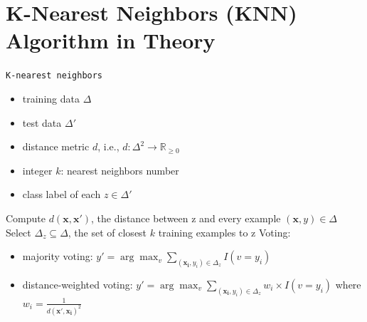 \documentclass{article}
\newcommand{\argmax}{\arg\!\max}
\begin{document}
\section*{K-Nearest Neighbors (KNN) Algorithm in Theory}
{\small
\begin{center}
\begin{algorithmic}[1]\label{alg:knn}
 \texttt{K-nearest neighbors}
\begin{itemize}
\item \textsf{training data} $\Delta$
\item \textsf{test data} $\Delta'$  
\item \textsf{distance metric} $d$, i.e., $d:\Delta^2\rightarrow \mathbb{R}_{\geq 0}$ 
\item \textsf{integer} $k$: \textsf{nearest neighbors number}
\end{itemize}
\begin{itemize}
\item \textsf{class label of each} $z \in \Delta' $
\end{itemize}
\State  \textsf{Compute} $d(\mathbf{x},\mathbf{x}')$, \textsf{the distance between z and every example} $(\mathbf{x},y) \in \Delta$
\State  \textsf{Select} $\Delta_z \subseteq \Delta$, \textsf{the set of closest} $k$ \textsf{training examples to z}
\State \textsf{Voting:}
\begin{itemize}
\item \textsf{majority voting}:
$y' = \argmax_v  \sum_{(\mathbf{x_i},y_i)\in\Delta_z} I(v=y_i)$
\item \textsf{distance-weighted voting}: $y' = \argmax_v  \sum_{(\mathbf{x_i},y_i)\in\Delta_z} w_i \times I(v=y_i)$ \textsf{where} $ w_i = \frac{1}{d(\mathbf{x',x_i})^2}$
\end{itemize}
\EndFor
\end{algorithmic}
\end{center}}


\vspace{30pt}
\end{document}
